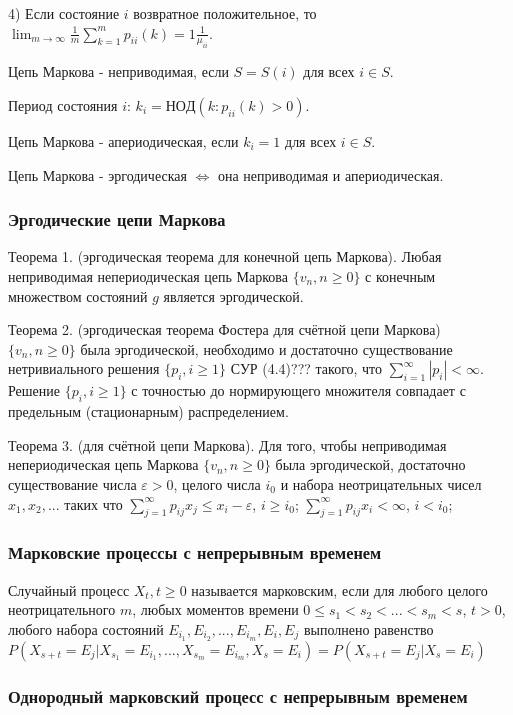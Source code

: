 4) Если состояние $i$ возвратное положительное, то $\lim_{m \to \infty} \frac{1}{m} \sum_{k=1}^m p_{ii}(k)=1\frac{1}{\mu _{ii}}$.

Цепь Маркова - неприводимая, если $S=S(i)$ для всех $i\in S$.

Период состояния $i$: $k_i=НОД(k: p_{ii}(k)>0)$.

Цепь Маркова - апериодическая, если $k_i=1$ для всех $i\in S$.

Цепь Маркова - эргодическая $\Leftrightarrow$ она неприводимая и апериодическая.

\subsubsection*{Эргодические цепи Маркова}

Теорема 1. (эргодическая теорема для конечной цепь Маркова). Любая неприводимая непериодическая цепь Маркова $\{v_n, n\geq 0 \}$ с конечным множеством состояний $g$ является эргодической.

Теорема 2. (эргодическая теорема Фостера для счётной цепи Маркова) $\{v_n, n \geq 0 \}$ была эргодической, необходимо и достаточно существование нетривиального решения $\{p_i, i \geq 1 \}$ СУР (4.4)??? такого, что $\sum_{i=1}^\infty |p_i|<\infty$.
Решение $\{p_i, i \geq 1 \}$ с точностью до нормирующего множителя совпадает с предельным (стационарным) распределением.

Теорема 3. (для счётной цепи Маркова). Для того, чтобы  неприводимая непериодическая цепь Маркова $\{v_n, n\geq 0 \}$ была эргодической, достаточно существование числа $\varepsilon > 0$, целого числа $i_0$ и набора неотрицательных чисел $x_1,x_2,...$ таких что
$\sum_{j=1}^\infty p_{ij} x_j \leq x_i - \varepsilon$, $i \geq i_0$;
$\sum_{j=1}^\infty p_{ij} x_i < \infty$, $i < i_0$;

\subsubsection*{Марковские процессы с непрерывным временем}

Случайный процесс $X_t, t \geq 0$ называется марковским, если для любого целого неотрицательного $m$, любых моментов времени $0\leq s_1<s_2<...<s_m<s$, $t>0$, любого набора состояний $E_{i_1}, E_{i_2},...,E_{i_m},E_i, E_j$ выполнено равенство $P(X_{s+t}=E_j | X_{s_1}=E_{i_1}, ..., X_{s_m}=E_{i_m}, X_s=E_i)= P(X_{s+t}=E_j | X_s=E_i)$

\subsubsection*{Однородный марковский процесс с непрерывным временем}

